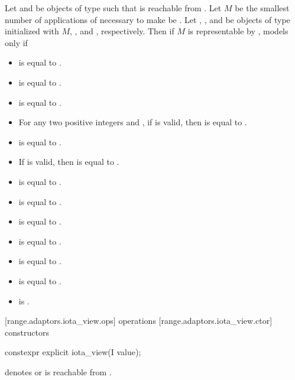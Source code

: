 \begin{addedblock}
Let  and  be objects of type  such that  is
reachable from . Let $M$ be the smallest number of applications
of  necessary to make  be . Let
, , and  be objects of type
initialized with $M$, , and , respectively. Then if
$M$ is representable by ,
 models  only if
\begin{itemize}
\item {} is equal to .
\item {} is equal to .
\item {} is equal to .
\item For any two positive integers  and , if
 is valid, then  is equal to
.
\item {} is equal to .
\item If  is valid, then  is equal to
.
\item {} is equal to .
\item {} is equal to .
\item {} is equal to .
\item {} is equal to .
\item {} is equal to .
\item {} is equal to .
\item {} is .
\end{itemize}

[range.adaptors.iota_view.ops]{ operations}
[range.adaptors.iota_view.ctor]{ constructors}

%
\begin{itemdecl}
constexpr explicit iota_view(I value);
\end{itemdecl}

\begin{itemdescr}
\pnum
\expects
{} denotes  or
 is reachable from .


\end{itemdescr}
\end{addedblock}
